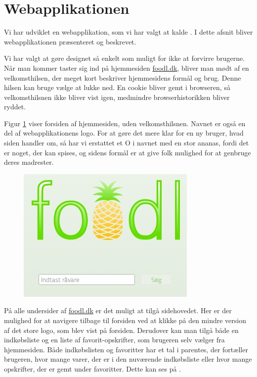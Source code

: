 \section{Webapplikationen}
\label{sec:webapplikationen}
Vi har udviklet en webapplikation, som vi har valgt at kalde \Foodl. I dette afsnit bliver webapplikationen præsenteret og beskrevet.

Vi har valgt at gøre designet så enkelt som muligt for ikke at forvirre brugerne. Når man kommer taster sig ind på hjemmesiden \url{foodl.dk}, bliver man mødt af en velkomsthilsen, der meget kort beskriver hjemmesidens formål og brug. Denne hilsen kan bruge vælge at lukke ned. En cookie bliver gemt i browseren, så velkomsthilsnen ikke bliver vist igen, medmindre browserhistorikken bliver ryddet.

Figur \ref{fig:foodl-forside} viser forsiden af hjemmesiden, uden velkomsthilsnen. Navnet \Foodl er også en del af webapplikationens logo. For at gøre det mere klar for en ny bruger, hvad siden handler om, så har vi erstattet et O i navnet med en stor ananas, fordi det er noget, der kan spises, og sidens formål er at give folk mulighed for at genbruge deres madrester. 

\begin{figure}[H]
	\centering
	\includegraphics[scale=0.7]{billeder/foodl/forside.jpg}
	\label{fig:foodl-forside}
\end{figure}

På alle undersider af \url{foodl.dk} er det muligt at tilgå sidehovedet. Her er der mulighed for at navigere tilbage til forsiden ved at klikke på den mindre version af det store logo, som blev vist på forsiden. Derudover kan man tilgå både en indkøbsliste og en liste af favorit-opskrifter, som brugeren selv vælger fra hjemmesiden. Både indkøbslisten og favoritter har et tal i parentes, der \fx fortæller brugeren, hvor mange varer, der er i den nuværende indkøbsliste eller hvor mange opskrifter, der er gemt under favoritter. Dette kan ses på .

